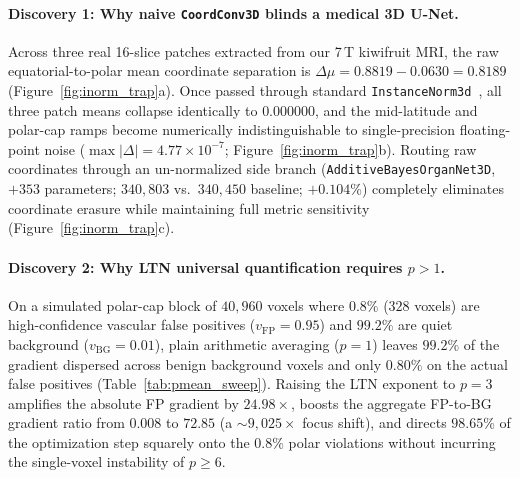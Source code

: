 \documentclass[10pt,a4paper]{article}
\renewcommand{\_}{\origunderscore\allowbreak}
\begin{document}
\paragraph{Discovery 1: Why naive \texttt{CoordConv3D} blinds a medical 3D U-Net.}
Across three real 16-slice patches extracted from our 7\,T kiwifruit MRI, the raw equatorial-to-polar mean coordinate separation is $\Delta\mu = 0.8819 - 0.0630 = 0.8189$ (Figure~\ref{fig:inorm_trap}a). Once passed through standard \texttt{InstanceNorm3d}~\cite{ulyanov2016instancenorm}, all three patch means collapse identically to $0.000000$, and the mid-latitude and polar-cap ramps become numerically indistinguishable to single-precision floating-point noise ($\max|\Delta| = 4.77 \times 10^{-7}$; Figure~\ref{fig:inorm_trap}b). Routing raw coordinates through an un-normalized side branch (\texttt{AdditiveBayesOrganNet3D}, $+353$ parameters; $340{,}803$ vs.\ $340{,}450$ baseline; $+0.104\%$) completely eliminates coordinate erasure while maintaining full metric sensitivity (Figure~\ref{fig:inorm_trap}c).

\paragraph{Discovery 2: Why LTN universal quantification requires $p > 1$.}
On a simulated polar-cap block of $40{,}960$ voxels where $0.8\%$ ($328$ voxels) are high-confidence vascular false positives ($v_{\text{FP}} = 0.95$) and $99.2\%$ are quiet background ($v_{\text{BG}} = 0.01$), plain arithmetic averaging ($p = 1$) leaves $99.2\%$ of the gradient dispersed across benign background voxels and only $0.80\%$ on the actual false positives (Table~\ref{tab:pmean_sweep}). Raising the LTN exponent to $p = 3$ amplifies the absolute FP gradient by $\mathbf{24.98\times}$, boosts the aggregate FP-to-BG gradient ratio from $0.008$ to $\mathbf{72.85}$ (a $\sim 9{,}025\times$ focus shift), and directs $\mathbf{98.65\%}$ of the optimization step squarely onto the $0.8\%$ polar violations without incurring the single-voxel instability of $p \ge 6$.
\end{document}
